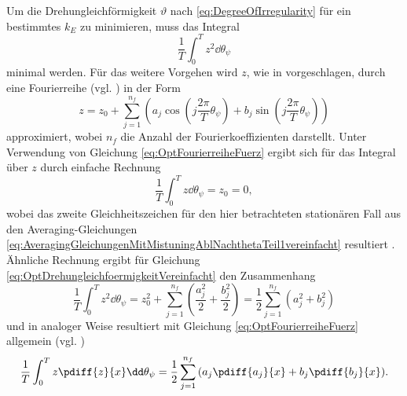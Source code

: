 %
Um die Drehungleichförmigkeit $\vartheta$
%
nach \eqref{eq:DegreeOfIrregularity} für ein bestimmtes $k_E$ zu minimieren, muss das Integral  
\begin{equation}
	\frac{1}{T} \int_0^T{z^2 \dd \theta_{\psi}}
	\label{eq:OptDrehungleichfoermigkeitVereinfacht}
\end{equation}
minimal werden.
%
%
%
Für das weitere Vorgehen wird $z$, wie in \cite{Mayet:CPVAMitMistuning} vorgeschlagen,
durch eine Fourierreihe (vgl. ) in der Form
\begin{equation}
	z = z_0 + \sum_{j=1}^{n_f} \left( a_j  \cos \left( j \frac{2 \pi}{T} \theta_{\psi} \right) + b_j  \sin \left( j \frac{2 \pi}{T} \theta_{\psi} \right) \right)
		\label{eq:OptFourierreiheFuerz}
\end{equation}
approximiert, wobei $n_f$ die Anzahl der Fourierkoeffizienten darstellt. 
Unter Verwendung von Gleichung \eqref{eq:OptFourierreiheFuerz} ergibt sich für das Integral über $z$ durch einfache Rechnung
%
%
%
%
%
\begin{equation}
	\frac{1}{T} \int_0^T{z  \dd \theta_{\psi}} = 	z_0 = 0,
			\label{eq:OptFourierreiheIntegralUeberz}
\end{equation}
wobei das zweite Gleichheitszeichen für den hier betrachteten stationären Fall aus den
Averaging-Gleichungen \eqref{eq:AveragingGleichungenMitMistuningAblNachthetaTeil1vereinfacht} 
resultiert \cite{Mayet:CPVAMitMistuning}.  
Ähnliche Rechnung ergibt für Gleichung \eqref{eq:OptDrehungleichfoermigkeitVereinfacht}
den Zusammenhang
%
%
%
%
\begin{equation}
	\frac{1}{T} \int_0^T{z^2  \dd \theta_{\psi}} = 	z_0^2 +  \sum_{j=1}^{n_f}{\left( \frac{a_j^2}{2} + \frac{b_j^2}{2} \right)} 
					= 	 \frac{1}{2} \sum_{j=1}^{n_f}{\left( a_j^2 + b_j^2 \right)} 
			\label{eq:OptFourierreiheIntegralUeberz2}
\end{equation}
%
%
%
%
und in analoger Weise resultiert mit Gleichung \eqref{eq:OptFourierreiheFuerz} allgemein (vgl. \cite{Mayet:CPVAMitMistuning})
%
\begin{equation}
	\frac{1}{T} \int_0^T{z \pdiff{z}{x} \dd \theta_{\psi}} = \frac{1}{2} \sum_{j=1}^{n_f}{\left(a_j \pdiff{a_j}{x} + b_j \pdiff{b_j}{x}\right)}.
				\label{eq:OptFourierreiheIntegralzdzdx}
\end{equation}















